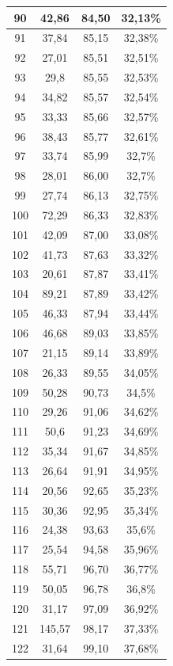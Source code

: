 \begin{longtable}{|c|c|c|c|}
	90 & 42,86 & 84,50 & 32,13\% \\ \hline
	91 & 37,84 & 85,15 & 32,38\% \\ \hline
	92 & 27,01 & 85,51 & 32,51\% \\ \hline
	93 & 29,8 & 85,55 & 32,53\% \\ \hline
	94 & 34,82 & 85,57 & 32,54\% \\ \hline
	95 & 33,33 & 85,66 & 32,57\% \\ \hline
	96 & 38,43 & 85,77 & 32,61\% \\ \hline
	97 & 33,74 & 85,99 & 32,7\% \\ \hline
	98 & 28,01 & 86,00 & 32,7\% \\ \hline
	99 & 27,74 & 86,13 & 32,75\% \\ \hline
	100 & 72,29 & 86,33 & 32,83\% \\ \hline
	101 & 42,09 & 87,00 & 33,08\% \\ \hline
	102 & 41,73 & 87,63 & 33,32\% \\ \hline
	103 & 20,61 & 87,87 & 33,41\% \\ \hline
	104 & 89,21 & 87,89 & 33,42\% \\ \hline
	105 & 46,33 & 87,94 & 33,44\% \\ \hline
	106 & 46,68 & 89,03 & 33,85\% \\ \hline
	107 & 21,15 & 89,14 & 33,89\% \\ \hline
	108 & 26,33 & 89,55 & 34,05\% \\ \hline
	109 & 50,28 & 90,73 & 34,5\% \\ \hline
	110 & 29,26 & 91,06 & 34,62\% \\ \hline
	111 & 50,6 & 91,23 & 34,69\% \\ \hline
	112 & 35,34 & 91,67 & 34,85\% \\ \hline
	113 & 26,64 & 91,91 & 34,95\% \\ \hline
	114 & 20,56 & 92,65 & 35,23\% \\ \hline
	115 & 30,36 & 92,95 & 35,34\% \\ \hline
	116 & 24,38 & 93,63 & 35,6\% \\ \hline
	117 & 25,54 & 94,58 & 35,96\% \\ \hline
	118 & 55,71 & 96,70 & 36,77\% \\ \hline
	119 & 50,05 & 96,78 & 36,8\% \\ \hline
	120 & 31,17 & 97,09 & 36,92\% \\ \hline
	121 & 145,57 & 98,17 & 37,33\% \\ \hline
	122 & 31,64 & 99,10 & 37,68\% \\ \hline

\end{longtable}
